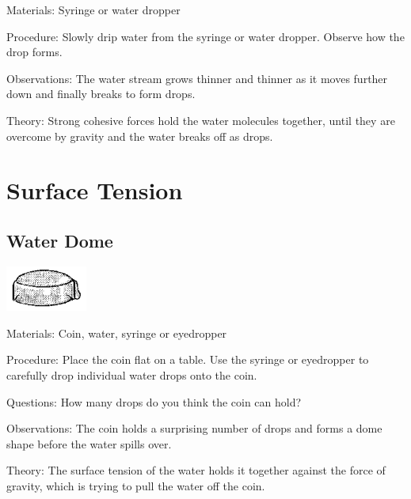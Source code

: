 \begin{multicols}{2}
\begin{description*}
\item[Materials:]{Syringe or water dropper}
\item[Procedure:]{Slowly drip water from the syringe or water dropper. Observe how the drop forms.}
\item[Observations:]{The water stream grows thinner and thinner as it moves further down and finally breaks to form drops.}
\item[Theory:]{Strong cohesive forces hold the water molecules together, until they are overcome by gravity and the water breaks off as drops.}
\end{description*}


\columnbreak


\section*{Surface Tension}


\subsection{Water Dome}

\begin{center}
\includegraphics[width=0.2\textwidth]{./img/source/water-dome.png}
\end{center}

\begin{description*}
\item[Materials:]{Coin, water, syringe or eyedropper}
\item[Procedure:]{Place the coin flat on a table. Use the syringe or eyedropper to carefully drop individual water drops onto the coin.}
\item[Questions:]{How many drops do you think the coin can hold?}
\item[Observations:]{The coin holds a surprising number of drops and forms a dome shape before the water spills over.}
\item[Theory:]{The surface tension of the water holds it together against the force of gravity, which is trying to pull the water off the coin.}
\end{description*}


\end{multicols}
